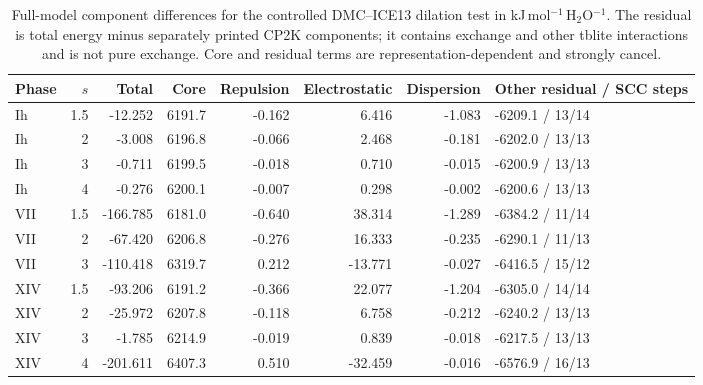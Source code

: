 \begin{table}
\caption{Full-model component differences for the controlled DMC--ICE13 dilation test in kJ\,mol$^{-1}$\,H$_2$O$^{-1}$. The residual is total energy minus separately printed CP2K components; it contains exchange and other tblite interactions and is not pure exchange. Core and residual terms are representation-dependent and strongly cancel.}
\begin{tabular}{lrrrrrrl}
\hline\hline
Phase & $s$ & Total & Core & Repulsion & Electrostatic & Dispersion & Other residual / SCC steps \\
\hline
Ih & 1.5 & -12.252 & 6191.7 & -0.162 & 6.416 & -1.083 & -6209.1 / 13/14 \\
Ih & 2 & -3.008 & 6196.8 & -0.066 & 2.468 & -0.181 & -6202.0 / 13/13 \\
Ih & 3 & -0.711 & 6199.5 & -0.018 & 0.710 & -0.015 & -6200.9 / 13/13 \\
Ih & 4 & -0.276 & 6200.1 & -0.007 & 0.298 & -0.002 & -6200.6 / 13/13 \\
VII & 1.5 & -166.785 & 6181.0 & -0.640 & 38.314 & -1.289 & -6384.2 / 11/14 \\
VII & 2 & -67.420 & 6206.8 & -0.276 & 16.333 & -0.235 & -6290.1 / 11/13 \\
VII & 3 & -110.418 & 6319.7 & 0.212 & -13.771 & -0.027 & -6416.5 / 15/12 \\
XIV & 1.5 & -93.206 & 6191.2 & -0.366 & 22.077 & -1.204 & -6305.0 / 14/14 \\
XIV & 2 & -25.972 & 6207.8 & -0.118 & 6.758 & -0.212 & -6240.2 / 13/13 \\
XIV & 3 & -1.785 & 6214.9 & -0.019 & 0.839 & -0.018 & -6217.5 / 13/13 \\
XIV & 4 & -201.611 & 6407.3 & 0.510 & -32.459 & -0.016 & -6576.9 / 16/13 \\
\hline\hline
\end{tabular}
\end{table}
